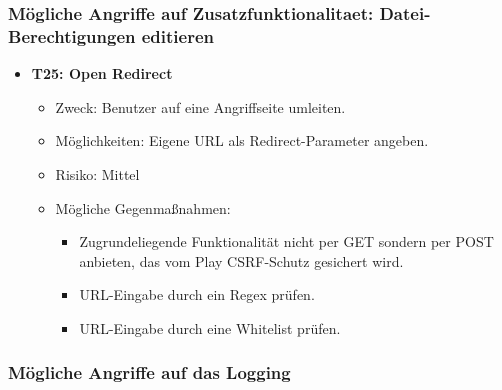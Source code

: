 \documentclass[12pt,DIV14,BCOR10mm,a4paper,parskip=half-,headsepline,headinclude,english,ngerman,bibliography=totocnumbered]{scrreprt}
\begin{document}
\subsubsection{Mögliche Angriffe auf Zusatzfunktionalitaet: Datei-Berechtigungen editieren}

\begin{itemize}

  \hypertarget{threat25}{}
  \item \textbf{T25: Open Redirect}
  \begin{itemize}
    \item Zweck: Benutzer auf eine Angriffseite umleiten.
    \item Möglichkeiten: Eigene URL als Redirect-Parameter angeben.
    \item Risiko: Mittel
    \item Mögliche Gegenmaßnahmen:
      \begin{itemize}
      	\item Zugrundeliegende Funktionalität nicht per GET sondern per POST anbieten, das vom Play CSRF-Schutz gesichert wird.
      	\item URL-Eingabe durch ein Regex prüfen.
      	\item URL-Eingabe durch eine Whitelist prüfen.
      \end{itemize} 
  \end{itemize}
\end{itemize}

\subsubsection{Mögliche Angriffe auf das Logging}
\end{document}
